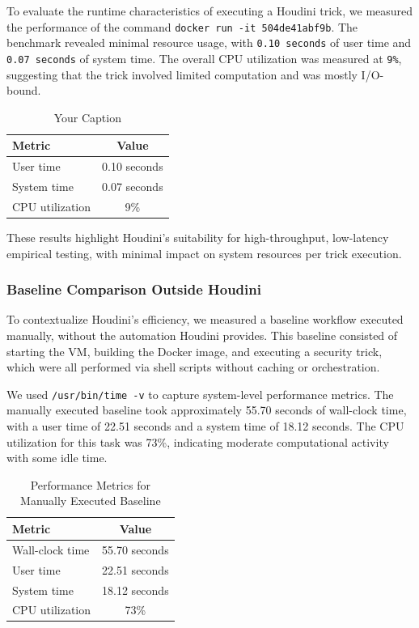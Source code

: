 \documentclass[12pt]{report}
\begin{document}
\begin{doublespace}
To evaluate the runtime characteristics of executing a Houdini trick, we measured the performance of the command \texttt{docker run -it 504de41abf9b}. The benchmark revealed minimal resource usage, with \texttt{0.10 seconds} of user time and \texttt{0.07 seconds} of system time. The overall CPU utilization was measured at \texttt{9\%}, suggesting that the trick involved limited computation and was mostly I/O-bound.

\begin{table}[h]
\centering
\caption{Your Caption}
\label{tab:your-label}
\begin{tabular}{|l|c|}  \hline
\textbf{Metric} & \textbf{Value} \\
\hline
User time & 0.10 seconds \\
System time & 0.07 seconds \\
CPU utilization & 9\% \\
\hline
\end{tabular}
\end{table}


These results highlight Houdini's suitability for high-throughput, low-latency empirical testing, with minimal impact on system resources per trick execution.


\subsubsection{Baseline Comparison Outside Houdini}

To contextualize Houdini’s efficiency, we measured a baseline workflow executed manually, without the automation Houdini provides. This baseline consisted of starting the VM, building the Docker image, and executing a security trick, which were all performed via shell scripts without caching or orchestration.

We used \texttt{/usr/bin/time -v} to capture system-level performance metrics. The manually executed baseline took approximately 55.70 seconds of wall-clock time, with a user time of 22.51 seconds and a system time of 18.12 seconds. The CPU utilization for this task was 73\%, indicating moderate computational activity with some idle time.

\begin{table}[h]
\centering
\caption{Performance Metrics for Manually Executed Baseline}
\label{tab:baseline-manual}
\begin{tabular}{|l|c|}
\hline
\textbf{Metric}         & \textbf{Value} \\
\hline
Wall-clock time         & 55.70 seconds \\
User time               & 22.51 seconds \\
System time             & 18.12 seconds \\
CPU utilization         & 73\% \\
\hline
\end{tabular}
\end{table}



\end{doublespace}
\end{document}
